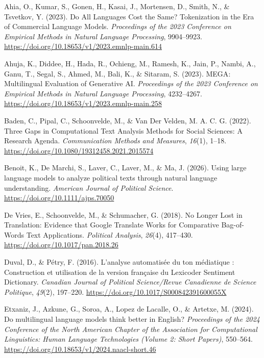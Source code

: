 \documentclass[
  man,
  floatsintext,
  longtable,
  nolmodern,
  notxfonts,
  notimes,
  colorlinks=true,linkcolor=blue,citecolor=blue,urlcolor=blue]{apa7}
\newlength{\cslhangindent}
\newenvironment{CSLReferences}[2] %
 {\begin{list}{}{%
  \setlength{\itemindent}{0pt}
  \setlength{\leftmargin}{0pt}
  \setlength{\parsep}{0pt}
  \ifodd #1
   \setlength{\leftmargin}{\cslhangindent}
   \setlength{\itemindent}{-1\cslhangindent}
  \fi
  \setlength{\itemsep}{#2\baselineskip}}}
 {\end{list}}
\begin{document}
\label{refs}
\begin{CSLReferences}{1}{0}
Ahia, O., Kumar, S., Gonen, H., Kasai, J., Mortensen, D., Smith, N., \&
Tsvetkov, Y. (2023). Do {All Languages Cost} the {Same}? {Tokenization}
in the {Era} of {Commercial Language Models}. \emph{Proceedings of the
2023 {Conference} on {Empirical Methods} in {Natural Language
Processing}}, 9904--9923.
\url{https://doi.org/10.18653/v1/2023.emnlp-main.614}

Ahuja, K., Diddee, H., Hada, R., Ochieng, M., Ramesh, K., Jain, P.,
Nambi, A., Ganu, T., Segal, S., Ahmed, M., Bali, K., \& Sitaram, S.
(2023). {MEGA}: {Multilingual Evaluation} of {Generative AI}.
\emph{Proceedings of the 2023 {Conference} on {Empirical Methods} in
{Natural Language Processing}}, 4232--4267.
\url{https://doi.org/10.18653/v1/2023.emnlp-main.258}

Baden, C., Pipal, C., Schoonvelde, M., \& Van Der Velden, M. A. C. G.
(2022). Three {Gaps} in {Computational Text Analysis Methods} for
{Social Sciences}: {A Research Agenda}. \emph{Communication Methods and
Measures}, \emph{16}(1), 1--18.
\url{https://doi.org/10.1080/19312458.2021.2015574}

Benoit, K., De Marchi, S., Laver, C., Laver, M., \& Ma, J. (2026). Using
large language models to analyze political texts through natural
language understanding. \emph{American Journal of Political Science}.
\url{https://doi.org/10.1111/ajps.70050}

De Vries, E., Schoonvelde, M., \& Schumacher, G. (2018). No {Longer
Lost} in {Translation}: {Evidence} that {Google Translate Works} for
{Comparative Bag-of-Words Text Applications}. \emph{Political Analysis},
\emph{26}(4), 417--430. \url{https://doi.org/10.1017/pan.2018.26}

Duval, D., \& Pétry, F. (2016). L'analyse automatis{é}e du ton
m{é}diatique : Construction et utilisation de la version fran{ç}aise du
{Lexicoder Sentiment Dictionary}. \emph{Canadian Journal of Political
Science/Revue Canadienne de Science Politique}, \emph{49}(2), 197--220.
\url{https://doi.org/10.1017/S000842391600055X}

Etxaniz, J., Azkune, G., Soroa, A., Lopez de Lacalle, O., \& Artetxe, M.
(2024). Do multilingual language models think better in {E}nglish?
\emph{Proceedings of the 2024 Conference of the North American Chapter
of the Association for Computational Linguistics: Human Language
Technologies (Volume 2: Short Papers)}, 550--564.
\url{https://doi.org/10.18653/v1/2024.naacl-short.46}


\end{CSLReferences}
\end{document}
